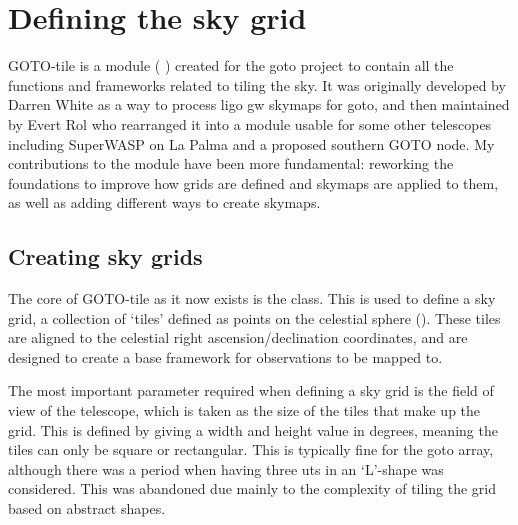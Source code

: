 \newpage
\section{Defining the sky grid}
\label{sec:gototile}
\begin{colsection}


\begin{colsection}


GOTO-tile is a  module ( ) created for the \gls{goto} project to contain all the functions and frameworks related to tiling the sky. It was originally developed by Darren White as a way to process \gls{ligo} \gls{gw} skymaps for \gls{goto}, and then maintained by Evert Rol who rearranged it into a module usable for some other telescopes including SuperWASP on La Palma and a proposed southern GOTO node. My contributions to the module have been more fundamental: reworking the foundations to improve how grids are defined and skymaps are applied to them, as well as adding different ways to create skymaps.

\end{colsection}


\subsection{Creating sky grids}
\label{sec:grids}
\begin{colsection}

The core of GOTO-tile as it now exists is the  class. This is used to define a sky grid, a collection of `tiles' defined as points on the celestial sphere (). These tiles are aligned to the celestial right ascension/declination coordinates, and are designed to create a base framework for observations to be mapped to.

The most important parameter required when defining a sky grid is the field of view of the telescope, which is taken as the size of the tiles that make up the grid. This is defined by giving a width and height value in degrees, meaning the tiles can only be square or rectangular. This is typically fine for the \gls{goto} array, although there was a period when having three \glspl{ut} in an `L'-shape was considered. This was abandoned due mainly to the complexity of tiling the grid based on abstract shapes.


\end{colsection}
\end{colsection}
